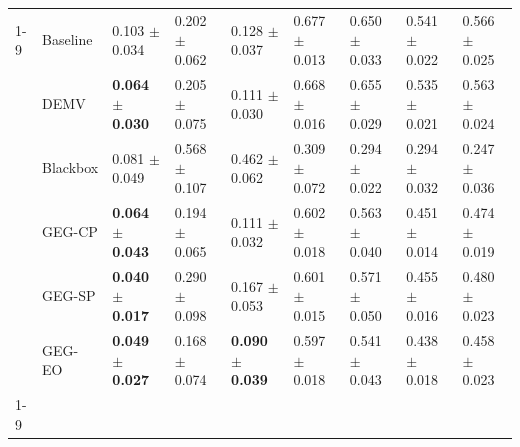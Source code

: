 \begin{table}
\begin{tabular}{lllllllll}
\cline{1-9}
\multirow[t]{6}{*}{wine} & Baseline & 0.103 $\pm$ 0.034 & 0.202 $\pm$ 0.062 & 0.128 $\pm$ 0.037 & 0.677 $\pm$ 0.013 & 0.650 $\pm$ 0.033 & 0.541 $\pm$ 0.022 & 0.566 $\pm$ 0.025 \\
 & DEMV & \textbf{0.064 $\pm$ 0.030} & 0.205 $\pm$ 0.075 & 0.111 $\pm$ 0.030 & 0.668 $\pm$ 0.016 & 0.655 $\pm$ 0.029 & 0.535 $\pm$ 0.021 & 0.563 $\pm$ 0.024 \\
 & Blackbox & 0.081 $\pm$ 0.049 & 0.568 $\pm$ 0.107 & 0.462 $\pm$ 0.062 & 0.309 $\pm$ 0.072 & 0.294 $\pm$ 0.022 & 0.294 $\pm$ 0.032 & 0.247 $\pm$ 0.036 \\
 & GEG-CP & \textbf{0.064 $\pm$ 0.043} & 0.194 $\pm$ 0.065 & 0.111 $\pm$ 0.032 & 0.602 $\pm$ 0.018 & 0.563 $\pm$ 0.040 & 0.451 $\pm$ 0.014 & 0.474 $\pm$ 0.019 \\
 & GEG-SP & \textbf{0.040 $\pm$ 0.017} & 0.290 $\pm$ 0.098 & 0.167 $\pm$ 0.053 & 0.601 $\pm$ 0.015 & 0.571 $\pm$ 0.050 & 0.455 $\pm$ 0.016 & 0.480 $\pm$ 0.023 \\
 & GEG-EO & \textbf{0.049 $\pm$ 0.027} & 0.168 $\pm$ 0.074 & \textbf{0.090 $\pm$ 0.039} & 0.597 $\pm$ 0.018 & 0.541 $\pm$ 0.043 & 0.438 $\pm$ 0.018 & 0.458 $\pm$ 0.023 \\
\cline{1-9}
\bottomrule
\end{tabular}
\end{table}

